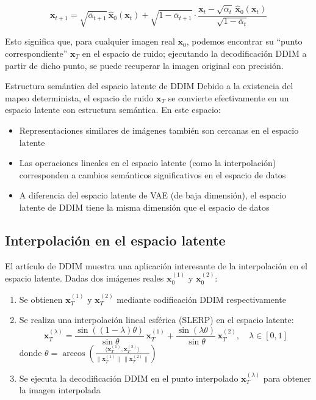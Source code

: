 \documentclass[a4paper]{article}
\begin{document}
$$
\mathbf{x}_{t+1} = \sqrt{\bar{\alpha}_{t+1}}\,\hat{\mathbf{x}}_0(\mathbf{x}_t) + \sqrt{1-\bar{\alpha}_{t+1}}\cdot\frac{\mathbf{x}_t - \sqrt{\bar{\alpha}_t}\,\hat{\mathbf{x}}_0(\mathbf{x}_t)}{\sqrt{1-\bar{\alpha}_t}}
$$

Esto significa que, para cualquier imagen real $\mathbf{x}_0$, podemos encontrar su ``punto correspondiente'' $\mathbf{x}_T$ en el espacio de ruido; ejecutando la decodificación DDIM a partir de dicho punto, se puede recuperar la imagen original con precisión.

\begin{importantbox}{Estructura semántica del espacio latente de DDIM}
Debido a la existencia del mapeo determinista, el espacio de ruido $\mathbf{x}_T$ se convierte efectivamente en un espacio latente con estructura semántica. En este espacio:
\begin{itemize}
    \item Representaciones similares de imágenes también son cercanas en el espacio latente
    \item Las operaciones lineales en el espacio latente (como la interpolación) corresponden a cambios semánticos significativos en el espacio de datos
    \item A diferencia del espacio latente de VAE (de baja dimensión), el espacio latente de DDIM tiene la misma dimensión que el espacio de datos
\end{itemize}
\end{importantbox}

\subsection{Interpolación en el espacio latente}

El artículo de DDIM muestra una aplicación interesante de la interpolación en el espacio latente. Dadas dos imágenes reales $\mathbf{x}_0^{(1)}$ y $\mathbf{x}_0^{(2)}$:

\begin{enumerate}
    \item Se obtienen $\mathbf{x}_T^{(1)}$ y $\mathbf{x}_T^{(2)}$ mediante codificación DDIM respectivamente
    \item Se realiza una interpolación lineal esférica (SLERP) en el espacio latente:
    $$
    \mathbf{x}_T^{(\lambda)} = \frac{\sin((1-\lambda)\theta)}{\sin\theta}\,\mathbf{x}_T^{(1)} + \frac{\sin(\lambda\theta)}{\sin\theta}\,\mathbf{x}_T^{(2)}, \quad \lambda \in [0, 1]
    $$
    donde $\theta = \arccos\left(\frac{\langle\mathbf{x}_T^{(1)}, \mathbf{x}_T^{(2)}\rangle}{\|\mathbf{x}_T^{(1)}\|\,\|\mathbf{x}_T^{(2)}\|}\right)$
    \item Se ejecuta la decodificación DDIM en el punto interpolado $\mathbf{x}_T^{(\lambda)}$ para obtener la imagen interpolada
\end{enumerate}
\end{document}
